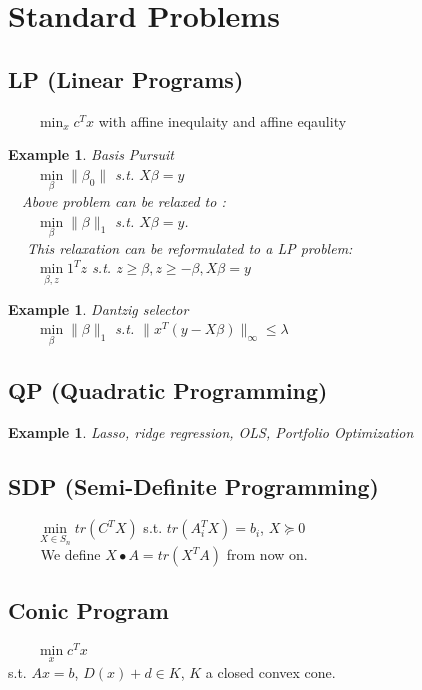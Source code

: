 \documentclass[10pt]{article}
\newtheorem{example}[ex]{Example}
\begin{document}
\section{Standard Problems}
\subsection{LP (Linear Programs) }
$\qquad \min_{x} c^{T}x $ with affine inequlaity and affine eqaulity

\begin{example}
Basis Pursuit \\
$\qquad \min\limits_{\beta} \| \beta_{0} \|$  s.t. $X \beta = y$  \\
$\quad$Above problem can be relaxed to : \\
$\qquad \min\limits_{\beta} \| \beta \|_{1}$ s.t. $X \beta = y$. \\
$\quad$ This relaxation can be reformulated to a LP problem: \\
$\qquad \min\limits_{\beta, z} 1^{T}z$ s.t. $z \ge \beta, z \ge -\beta, X\beta = y$
\end{example}

\begin{example}
Dantzig selector \\
$\qquad \min\limits_{\beta} \| \beta \|_{1} $ s.t. $\|x^{T}(y - X\beta)\|_{\infty} \le \lambda$
\end{example}

\subsection{ QP (Quadratic Programming) }
\begin{example}
Lasso, ridge regression, OLS, Portfolio Optimization 
\end{example}

\subsection {SDP (Semi-Definite Programming)}
$\qquad \min\limits_{X \in S_{n}} tr(C^{T}X)$ s.t. $tr(A_{i}^{T}X) = b_{i}$, $X \succeq 0$ \\
$\qquad$ We define $X \bullet A = tr(X^{T}A) $ from now on.

\subsection {Conic Program}
$\qquad \min\limits_{x}c^{T}x$ \\s.t. $Ax = b$, $D(x) + d \in K$, $K$ a closed convex cone.
\end{document}
